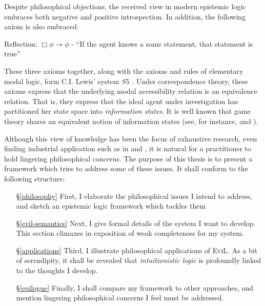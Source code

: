 \documentclass[11pt]{article}
\numberwithin{equation}{subsection}
\begin{document}
Despite philosophical objections, the received view in modern
epistemic logic embraces both negative and positive introspection.  In
addition, the following axiom is also embraced:
\begin{bul}
	\item Reflection: $\Box \phi \to \phi$ - ``If the agent knows a some statement, that statement is true''
\end{bul}
These three axioms together, along with the axioms and rules of
elementary modal logic, form C.I. Lewis' system $S5$
\citep{lewis_symbolic_1951}.  Under correspondence theory, these
axioms express that the underlying modal accessibility relation is an
equivalence relation. That is, they express that the ideal agent under
investigation has partitioned her state space into \emph{information
  states}.  It is well known that game theory shares an equivalent
notion of information states (see, for instance,
\citet{halpern_set-theoretic_1999} and \citet[chapter
3]{rubinstein_modeling_1998}).

Although this view of knowledge has been the focus of exhaustive
research, even finding industrial application such as in \citet{agray_ban_2002} and
\citet{hommersom_toward_2005,hommersom_update_2004}, it is natural for
a practitioner to hold lingering philosophical concerns.  The purpose
of this thesis is to present a framework which tries to address some
of these issues.  It shall conform to the following structure:
\begin{itemize}
  \item[\S\ref{philosophy}] First, I elaborate the
    philosophical issues I intend to address, and sketch an epistemic
    logic framework which tackles them
    \item[\S\ref{evil-semantics}] Next, I give formal details of the
      system I want to develop.  This section climaxes in exposition
      of weak completeness for my system.
  \item[\S\ref{applications}]  Third, I illustrate philosophical applications of
    \textsc{EviL}.  As a bit of serendipity, it shall be revealed that
    \emph{intuitionistic logic} is profoundly linked to the thoughts I
    develop.
  \item[\S\ref{epilogue}]  Finally, I shall compare my framework to
    other approaches, and mention lingering philosophical concerns I
    feel must be addressed.
\end{itemize}
\end{document}
